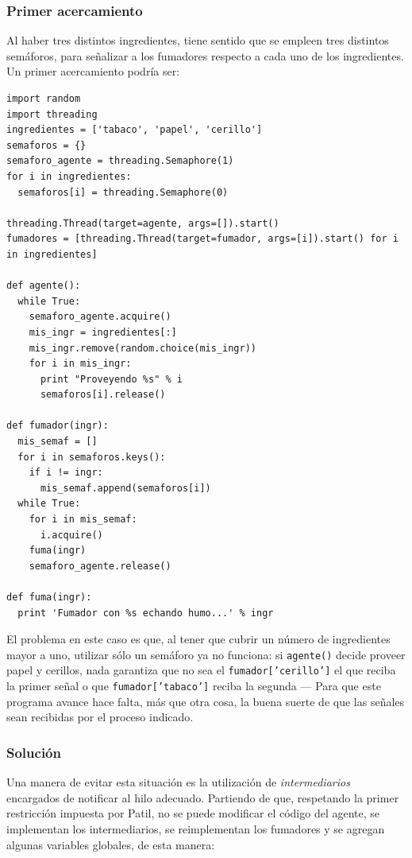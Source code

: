 \documentclass[11pt,fleqn]{book} %
\begin{document}
\subsubsection{Primer acercamiento}
\label{sec-3-3-8-2}


Al haber tres distintos ingredientes, tiene sentido que se empleen tres
distintos semáforos, para señalizar a los fumadores respecto a cada
uno de los ingredientes. Un primer acercamiento podría ser:


\begin{verbatim}
import random
import threading
ingredientes = ['tabaco', 'papel', 'cerillo']
semaforos = {}
semaforo_agente = threading.Semaphore(1)
for i in ingredientes:
  semaforos[i] = threading.Semaphore(0)

threading.Thread(target=agente, args=[]).start()
fumadores = [threading.Thread(target=fumador, args=[i]).start() for i in ingredientes]

def agente():
  while True:
    semaforo_agente.acquire()
    mis_ingr = ingredientes[:]
    mis_ingr.remove(random.choice(mis_ingr))
    for i in mis_ingr:
      print "Proveyendo %s" % i
      semaforos[i].release()

def fumador(ingr):
  mis_semaf = []
  for i in semaforos.keys():
    if i != ingr:
      mis_semaf.append(semaforos[i])
  while True:
    for i in mis_semaf:
      i.acquire()
    fuma(ingr)
    semaforo_agente.release()

def fuma(ingr):
  print 'Fumador con %s echando humo...' % ingr
\end{verbatim}

El problema en este caso es que, al tener que cubrir un número de
ingredientes mayor a uno, utilizar sólo un semáforo ya no funciona: si
\texttt{agente()} decide proveer papel y cerillos, nada garantiza que no sea
el \texttt{fumador['cerillo']} el que reciba la primer señal o que
\texttt{fumador['tabaco']} reciba la segunda — Para que este programa avance
hace falta, más que otra cosa, la buena suerte de que las señales sean
recibidas por el proceso indicado.
\subsubsection{Solución}
\label{sec-3-3-8-3}


Una manera de evitar esta situación es la utilización de
\emph{intermediarios} encargados de notificar al hilo adecuado. Partiendo
de que, respetando la primer restricción impuesta por Patil, no
se puede modificar el código del agente, se implementan los
intermediarios, se reimplementan los fumadores y se agregan algunas
variables globales, de esta manera:
\end{document}
